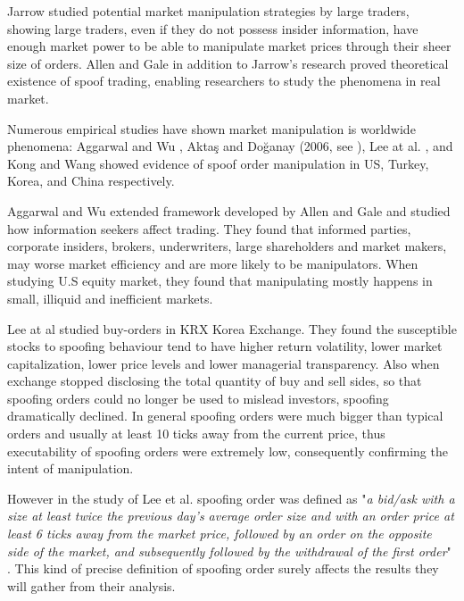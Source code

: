 \documentclass{tut-thesis}
\begin{document}
Jarrow \parencite*{Jarrow1992} studied potential market manipulation strategies by large traders, showing large traders, even if they do not possess insider information, have enough market power to be able to manipulate market prices through their sheer size of orders. Allen and Gale in addition to Jarrow's research proved theoretical existence of spoof trading, enabling researchers to study the phenomena in real market.

Numerous empirical studies have shown market manipulation is worldwide phenomena: Aggarwal and Wu \parencite*{AggarwalWu2006}, Aktaş and Doğanay (2006, see \cite{OgutDoganayAktas2009}), Lee at al. \parencite*{LeeEomPark2009}, and Kong and Wang \parencite*{KongWang2014} showed evidence of spoof order manipulation in US, Turkey, Korea, and China respectively.

Aggarwal and Wu \parencite*{AggarwalWu2006} extended framework developed by Allen and Gale and studied how information seekers affect trading. They found that informed parties, corporate insiders, brokers, underwriters, large shareholders and market makers, may worse market efficiency and are more likely to be manipulators. When studying U.S equity market, they found that manipulating mostly happens in small, illiquid and inefficient markets.

Lee at al \parencite*{LeeEomPark2009} studied buy-orders in KRX Korea Exchange. They found the susceptible stocks to spoofing behaviour tend to have higher return volatility, lower market capitalization, lower price levels and lower managerial transparency. Also when exchange stopped disclosing the total quantity of buy and sell sides, so that spoofing orders could no longer be used to mislead investors, spoofing dramatically declined. In general spoofing orders were much bigger than typical orders and usually at least 10 ticks away from the current price, thus executability of spoofing orders were extremely low, consequently confirming the intent of manipulation. \autocite{LeeEomPark2009}

However in the study of Lee et al. spoofing order was defined as "\textit{a bid/ask with a size at least twice the previous day’s average order size and with an order price at least 6 ticks away from the market price, followed by an order on the opposite side of the market, and subsequently followed by the withdrawal of the first order}" \autocite[p. 11]{LeeEomPark2009}. This kind of precise definition of spoofing order surely affects the results they will gather from their analysis. %
\end{document}
